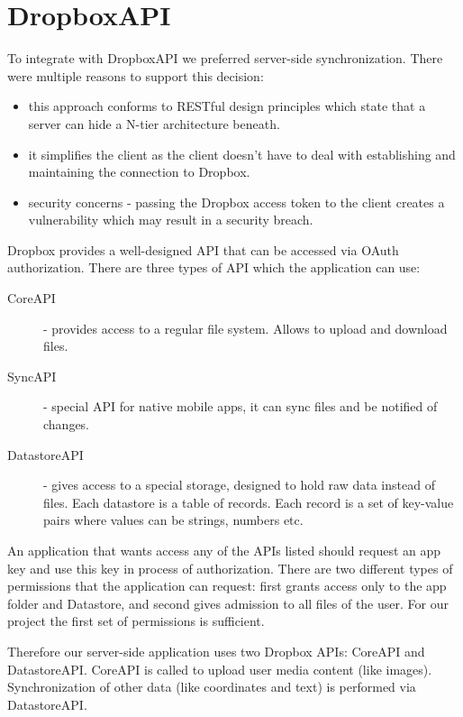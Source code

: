 \documentclass[12pt,a4paper]{article}
\begin{document}
\section{DropboxAPI}

To integrate with DropboxAPI we preferred server-side synchronization.
There were multiple reasons to support this decision:

\begin{itemize}
\item this approach conforms to RESTful design principles which state
  that a server can hide a N-tier architecture beneath.
\item it simplifies the client as the client doesn't have to deal with
  establishing and maintaining the connection to Dropbox.
\item security concerns - passing the Dropbox access token to the
  client creates a vulnerability which may result in a security breach.
\end{itemize}

Dropbox provides a well-designed API that can be accessed via OAuth
authorization. There are three types of API which the application can
use:

\begin{description}
\item[CoreAPI] - provides access to a regular file system. Allows to
  upload and download files.

\item[SyncAPI] - special API for native mobile apps, it can sync files
  and be notified of changes.

\item[DatastoreAPI] - gives access to a special storage, designed to
  hold raw data instead of files. Each datastore is a table of
  records. Each record is a set of key-value pairs where values can be
  strings, numbers etc.
\end{description}

An application that wants access any of the APIs listed should request
an app key and use this key in process of authorization. There are two
different types of permissions that the application can request: first
grants access only to the app folder and Datastore, and second gives
admission to all files of the user. For our project the first set of
permissions is sufficient.

Therefore our server-side application uses two Dropbox APIs: CoreAPI
and DatastoreAPI\@. CoreAPI is called to upload user media content (like
images). Synchronization of other data (like coordinates and text) is
performed via DatastoreAPI.
\end{document}
